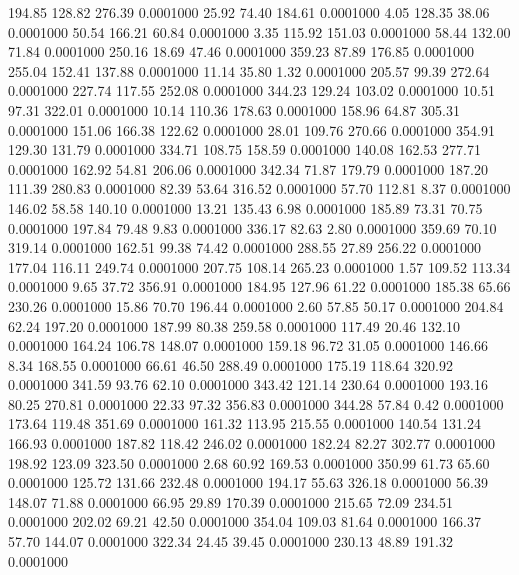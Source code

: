  194.85  128.82  276.39   0.0001000
  25.92   74.40  184.61   0.0001000
   4.05  128.35   38.06   0.0001000
  50.54  166.21   60.84   0.0001000
   3.35  115.92  151.03   0.0001000
  58.44  132.00   71.84   0.0001000
 250.16   18.69   47.46   0.0001000
 359.23   87.89  176.85   0.0001000
 255.04  152.41  137.88   0.0001000
  11.14   35.80    1.32   0.0001000
 205.57   99.39  272.64   0.0001000
 227.74  117.55  252.08   0.0001000
 344.23  129.24  103.02   0.0001000
  10.51   97.31  322.01   0.0001000
  10.14  110.36  178.63   0.0001000
 158.96   64.87  305.31   0.0001000
 151.06  166.38  122.62   0.0001000
  28.01  109.76  270.66   0.0001000
 354.91  129.30  131.79   0.0001000
 334.71  108.75  158.59   0.0001000
 140.08  162.53  277.71   0.0001000
 162.92   54.81  206.06   0.0001000
 342.34   71.87  179.79   0.0001000
 187.20  111.39  280.83   0.0001000
  82.39   53.64  316.52   0.0001000
  57.70  112.81    8.37   0.0001000
 146.02   58.58  140.10   0.0001000
  13.21  135.43    6.98   0.0001000
 185.89   73.31   70.75   0.0001000
 197.84   79.48    9.83   0.0001000
 336.17   82.63    2.80   0.0001000
 359.69   70.10  319.14   0.0001000
 162.51   99.38   74.42   0.0001000
 288.55   27.89  256.22   0.0001000
 177.04  116.11  249.74   0.0001000
 207.75  108.14  265.23   0.0001000
   1.57  109.52  113.34   0.0001000
   9.65   37.72  356.91   0.0001000
 184.95  127.96   61.22   0.0001000
 185.38   65.66  230.26   0.0001000
  15.86   70.70  196.44   0.0001000
   2.60   57.85   50.17   0.0001000
 204.84   62.24  197.20   0.0001000
 187.99   80.38  259.58   0.0001000
 117.49   20.46  132.10   0.0001000
 164.24  106.78  148.07   0.0001000
 159.18   96.72   31.05   0.0001000
 146.66    8.34  168.55   0.0001000
  66.61   46.50  288.49   0.0001000
 175.19  118.64  320.92   0.0001000
 341.59   93.76   62.10   0.0001000
 343.42  121.14  230.64   0.0001000
 193.16   80.25  270.81   0.0001000
  22.33   97.32  356.83   0.0001000
 344.28   57.84    0.42   0.0001000
 173.64  119.48  351.69   0.0001000
 161.32  113.95  215.55   0.0001000
 140.54  131.24  166.93   0.0001000
 187.82  118.42  246.02   0.0001000
 182.24   82.27  302.77   0.0001000
 198.92  123.09  323.50   0.0001000
   2.68   60.92  169.53   0.0001000
 350.99   61.73   65.60   0.0001000
 125.72  131.66  232.48   0.0001000
 194.17   55.63  326.18   0.0001000
  56.39  148.07   71.88   0.0001000
  66.95   29.89  170.39   0.0001000
 215.65   72.09  234.51   0.0001000
 202.02   69.21   42.50   0.0001000
 354.04  109.03   81.64   0.0001000
 166.37   57.70  144.07   0.0001000
 322.34   24.45   39.45   0.0001000
 230.13   48.89  191.32   0.0001000
